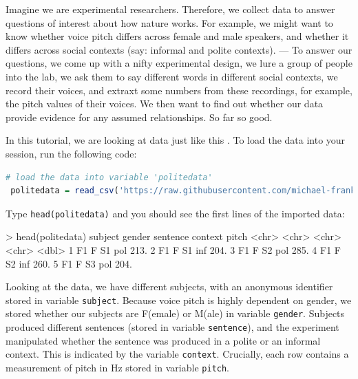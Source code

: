 \documentclass[nobib]{tufte-handout}
\newcommand{\ri}[1]{\lstinline{#1}}  %
\begin{document}
Imagine we are experimental researchers. Therefore, we collect data to answer questions of
interest about how nature works. For example, we might want to know whether voice pitch differs across female and male speakers, and whether it differs across social contexts (say: informal and polite contexts). --- To answer our questions, we come up with a nifty experimental design, we lure a group of people into the lab, we ask them to say different words in different social contexts, we record their voices, and extraxt some numbers from these recordings, for example, the pitch values of their voices. We then want to find out whether our data provide evidence for any assumed relationships. So far so good.

In this tutorial, we are looking at data just like this
\citep[following][]{Winter2013:Linear-models-a}. To load the data into your session,
run the following code:

\medskip

\begin{lstlisting}[language=R]
  # load the data into variable 'politedata'
 politedata = read_csv('https://raw.githubusercontent.com/michael-franke/bayes_mixed_regression_tutorial/master/code/politeness_data.csv') 
\end{lstlisting}

\vspace*{-0.5cm}

\noindent Type \ri{head(politedata)} and you should see the first lines of the imported
data:

\medskip


\begin{rc}
> head(politedata)
   subject gender sentence context pitch
   <chr>   <chr>  <chr>    <chr>   <dbl>
 1 F1      F      S1       pol      213.
 2 F1      F      S1       inf      204.
 3 F1      F      S2       pol      285.
 4 F1      F      S2       inf      260.
 5 F1      F      S3       pol      204.
\end{rc}

\medskip

\noindent Looking at the data, we have different subjects, with an anonymous identifier stored
in variable \texttt{subject}. Because voice pitch is highly dependent on gender, we stored
whether our subjects are F(emale) or M(ale) in variable \texttt{gender}. Subjects produced
different sentences (stored in variable \texttt{sentence}), and the experiment manipulated
whether the sentence was produced in a polite or an informal context. This is indicated by the
variable \texttt{context}. Crucially, each row contains a measurement of pitch in Hz stored in
variable \texttt{pitch}.
\end{document}
